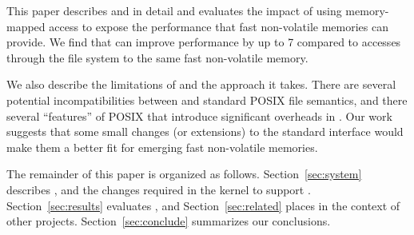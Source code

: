 This paper describes \Muse{} and \Switch{} in detail and evaluates the impact
of using memory-mapped access to expose the performance that fast non-volatile
memories can provide.  We find that \Muse{} can improve performance by up to
7\x{} compared to accesses through the file system to the same fast
non-volatile memory.

We also describe the limitations of \Muse{} and the approach it takes.  There
are several potential incompatibilities between \Muse{} and standard POSIX file
semantics, and there several ``features'' of POSIX that introduce significant
overheads in \Muse{}.  Our work suggests that some small changes (or
extensions) to the standard interface would make them a better fit for emerging
fast non-volatile memories.

The remainder of this paper is organized as follows.  Section~\ref{sec:system}
describes \Muse{}, \Switch{} and the changes required in the kernel to support
\Muse{}.  Section~\ref{sec:results} evaluates \Muse{}, and
Section~\ref{sec:related} places \Muse{} in the context of other projects.
Section~\ref{sec:conclude} summarizes our conclusions.
